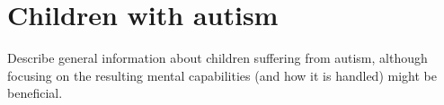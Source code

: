 \section{Children with autism}
Describe general information about children suffering from autism, although focusing on the resulting mental capabilities (and how it is handled) might be beneficial.